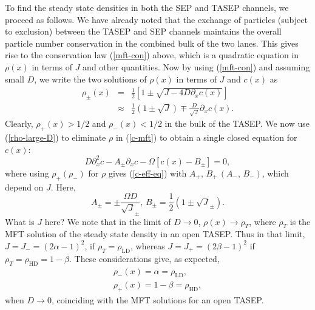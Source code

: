\documentclass[aps,pre,twocolumn,superscriptaddress,amsmath,amssymb,longbibliography,floatfix]{revtex4}
\begin{document}
{To find the steady state densities in both the SEP and TASEP channels, we proceed as follows. We have already noted that the exchange of particles (subject to exclusion) between the TASEP and SEP channels maintains the overall particle number conservation in the combined bulk of the two lanes. This gives rise to the conservation law (\ref{mft-con}) above, which is a quadratic equation in $\rho(x)$ in terms of $J$ and other quantities. %
Now by using (\ref{mft-con}) and assuming small $D$, we write the two solutions of $\rho(x)$ in terms of $J$ and $c(x)$ as
\begin{eqnarray}
 \rho_\pm(x) &=& \frac{1}{2}\left[1\pm\sqrt{J-4D\partial_x c(x)}\right]\nonumber \\
 &\approx& \frac{1}{2}(1\pm\sqrt J)\mp \frac{D}{\sqrt J}\partial_x c(x).\label{rho-large-D}
\end{eqnarray}
Clearly, $\rho_+(x)>1/2$ and $\rho_-(x)<1/2$ in the bulk of the TASEP.  
We now use (\ref{rho-large-D}) to eliminate $\rho$ in (\ref{c-mft}) to obtain a single closed equation for $c(x)$:
\begin{equation}
 D\partial_x^2 c - A_\pm \partial_x c - \Omega [c(x) - B_\pm]=0,\label{c-eff-eq}
\end{equation}
where using $\rho_+ (\rho_-)$ for $\rho$ gives (\ref{c-eff-eq}) with $A_+,\,B_+\,(A_-,\,B_-)$, which depend on $J$. Here,
\begin{equation}
 A_\pm = \pm \frac{\Omega D}{\sqrt J_\pm},\, B_\pm=\frac{1}{2}(1 \pm \sqrt J_\pm).
\end{equation}
What is $J$ here? We note that in the limit of $D\rightarrow 0$, $\rho(x)\rightarrow \rho_T$, where $\rho_T$ is the MFT solution of the steady state density in an open TASEP. Thus in that limit, $J=J_-=(2\alpha-1)^2$, if $\rho_T=\rho_\text{LD}$, whereas $J=J_+=(2\beta-1)^2$ if $\rho_T=\rho_\text{HD}=1-\beta$. These considerations give, as expected,
\begin{eqnarray}
 \rho_-(x)=\alpha=\rho_\text{LD},\\
 \rho_+(x)=1-\beta=\rho_\text{HD},
\end{eqnarray}
when $D\rightarrow 0$, coinciding with the MFT solutions for an open TASEP.  

}
\end{document}
